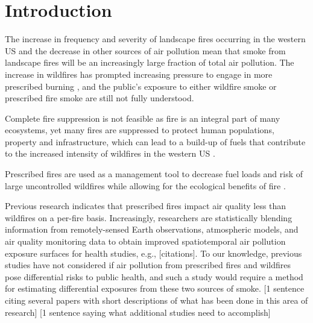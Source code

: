 \documentclass[authoryear]{elsarticle}
\begin{document}
\linenumbers
\section{Introduction}
The increase in frequency and severity of landscape fires occurring in the western US \citep{Dennison2014,Steel2014} and the decrease in other sources of air pollution \citep{EPAPM25Trends2017} mean that smoke from landscape fires will be an increasingly large fraction of total air pollution.
The increase in wildfires has prompted increasing pressure to engage in more prescribed burning \citep{Stephens2005}, and the public's exposure to either wildfire smoke or prescribed fire smoke are still not fully understood.



Complete fire suppression is not feasible as fire is an integral part of many ecosystems, yet many fires are suppressed to protect human populations, property and infrastructure, which can lead to a build-up of fuels that contribute to the increased intensity of wildfires in the western US \citep{Bowman2009,Schoennagel2017}.

Prescribed fires are used as a management tool to decrease fuel loads and risk of large uncontrolled wildfires while allowing for the ecological benefits of fire \citep{Schoennagel2017}. 

Previous research indicates that prescribed fires impact air quality  less than wildfires on a per-fire basis.  
Increasingly, researchers are statistically blending information from remotely-sensed Earth observations, atmospheric models, and air quality monitoring data to obtain improved spatiotemporal air pollution exposure surfaces for health studies, e.g., [citations]. 
To our knowledge, previous studies have not considered if air pollution from prescribed fires and wildfires pose differential risks to public health, and such a study would require a method for estimating differential exposures from these two sources of smoke. 
[1 sentence citing several papers with short descriptions of what has been done in this area of research]
[1 sentence saying what additional studies need to accomplish]
\end{document}
